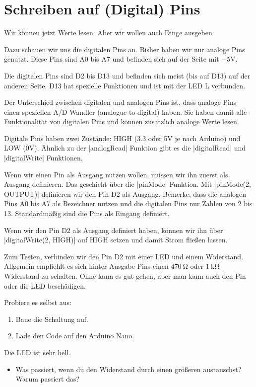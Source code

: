 \documentclass[a4paper,12pt]{book}
\begin{document}
\section*{Schreiben auf (Digital) Pins}
Wir können jetzt Werte lesen. Aber wir wollen auch Dinge ausgeben.

Dazu schauen wir uns die digitalen Pins an.
Bisher haben wir nur analoge Pins genutzt. Diese Pins sind A0 bis A7
und befinden sich auf der Seite mit +5V.

Die digitalen Pins sind D2 bis D13 und befinden sich meist (bis auf D13) auf der anderen Seite.
D13 hat spezielle Funktionen und ist mit der LED L verbunden.

Der Unterschied zwischen digitalen und analogen Pins ist, dass analoge Pins einen speziellen A/D Wandler (analogue-to-digital) haben.
Sie haben damit alle Funktionalität von digitalen Pins und können zusätzlich analoge Werte lesen.

Digitale Pins haben zwei Zustände: HIGH (3.3 oder 5V je nach Arduino) und LOW (0V).
Ähnlich zu der |analogRead| Funktion gibt es die |digitalRead| und |digitalWrite| Funktionen.



Wenn wir einen Pin als Ausgang nutzen wollen, müssen wir ihn zuerst als Ausgang definieren.
Das geschieht über die |pinMode| Funktion.
Mit |pinMode(2, OUTPUT)| definieren wir den Pin D2 als Ausgang.
Bemerke, dass die analogen Pins A0 bis A7 als Bezeichner nutzen und die digitalen Pins nur Zahlen von 2 bis 13.
Standardmäßig sind die Pins als Eingang definiert.

Wenn wir den Pin D2 als Ausgang definiert haben, können wir ihn über |digitalWrite(2, HIGH)| auf HIGH setzen
und damit Strom fließen lassen.


Zum Testen, verbinden wir den Pin D2 mit einer LED und einem Widerstand.
Allgemein empfiehlt es sich hinter Ausgabe Pins einen $\SI{470}{\ohm}$ oder $\SI{1}{\kohm}$ Widerstand zu schalten.
Ohne kann es gut gehen, aber man kann auch den Pin oder die LED beschädigen.

\begin{instruction}
  Probiere es selbst aus:
  \begin{enumerate}
    \item Baue die Schaltung auf.
    \item Lade den Code auf den Arduino Nano.
  \end{enumerate}
  Die LED ist sehr hell.
  \begin{itemize}
    \item Was passiert, wenn du den Widerstand durch einen größeren austauschst?
          Warum passiert das?
  \end{itemize}
\end{instruction}
\end{document}

